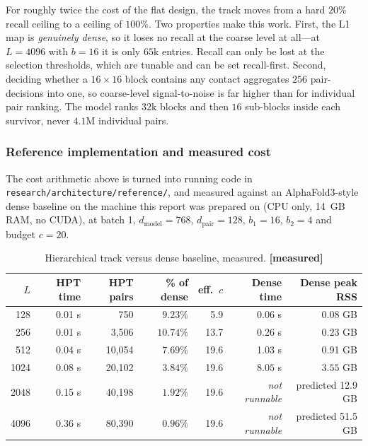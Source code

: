 \documentclass[11pt,a4paper]{article}
\newcommand{\meas}{\textcolor{measured}{\textbf{[measured]}}}
\begin{document}
For roughly twice the cost of the flat design, the track moves from a hard
$20\%$ recall ceiling to a ceiling of $100\%$. Two properties make this work.
First, the L1 map is \emph{genuinely dense}, so it loses no recall at the coarse
level at all---at $L=4096$ with $b=16$ it is only $65$k entries. Recall can only
be lost at the selection thresholds, which are tunable and can be set
recall-first. Second, deciding whether a $16\times16$ block contains any contact
aggregates $256$ pair-decisions into one, so coarse-level signal-to-noise is far
higher than for individual pair ranking. The model ranks $32$k blocks and then
$16$ sub-blocks inside each survivor, never $4.1$M individual pairs.

\subsubsection{Reference implementation and measured cost}

The cost arithmetic above is turned into running code in
\texttt{research/architecture/reference/}, and measured against an
AlphaFold3-style dense baseline on the machine this report was prepared on
(CPU only, 14~GB RAM, no CUDA), at batch 1, $d_{\text{model}}=768$,
$d_{\text{pair}}=128$, $b_1=16$, $b_2=4$ and budget $c=20$.

\begin{table}[h]
\centering
\caption{Hierarchical track versus dense baseline, measured. \meas}
\label{tab:bench}
\small
\begin{tabular}{rrrrrrr}
\toprule
\textbf{$L$} & \textbf{HPT time} & \textbf{HPT pairs} & \textbf{\% of dense} & \textbf{eff.\ $c$} & \textbf{Dense time} & \textbf{Dense peak RSS} \\
\midrule
128  & 0.01 s & 750    & $9.23\%$  & 5.9  & 0.06 s & 0.08 GB \\
256  & 0.01 s & 3{,}506  & $10.74\%$ & 13.7 & 0.26 s & 0.23 GB \\
512  & 0.04 s & 10{,}054 & $7.69\%$  & 19.6 & 1.03 s & 0.91 GB \\
1024 & $\mathbf{0.08}$ s & 20{,}102 & $3.84\%$ & 19.6 & $\mathbf{8.05}$ s & $\mathbf{3.55}$ GB \\
2048 & 0.15 s & 40{,}198 & $1.92\%$  & 19.6 & \emph{not runnable} & predicted 12.9 GB \\
4096 & $\mathbf{0.36}$ s & 80{,}390 & $\mathbf{0.96\%}$ & 19.6 & \emph{not runnable} & predicted 51.5 GB \\
\bottomrule
\end{tabular}
\end{table}
\end{document}

